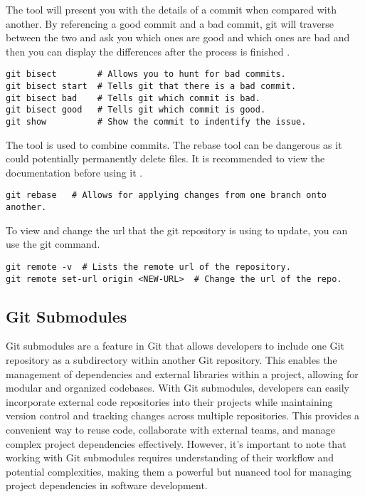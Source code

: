 The  tool will present you with the details of a commit when compared with another. By referencing a good commit and a bad commit, git will traverse between the two and ask you which ones are good and which ones are bad and then you can display the differences after the process is finished \cite{git}\cite{git: Advanced}.
\begin{lstlisting}[style=terminalstyle]
git bisect        # Allows you to hunt for bad commits.
git bisect start  # Tells git that there is a bad commit.
git bisect bad    # Tells git which commit is bad.
git bisect good   # Tells git which commit is good.
git show          # Show the commit to indentify the issue.
\end{lstlisting}

The  tool is used to combine commits. The rebase tool can be dangerous as it could potentially permanently delete files. It is recommended to view the documentation before using it \cite{git}\cite{git: Advanced}.
\begin{lstlisting}[style=terminalstyle]
git rebase   # Allows for applying changes from one branch onto another.
\end{lstlisting}

To view and change the url that the git repository is using to update, you can use the git  command.
\begin{lstlisting}[style=terminalstyle]
git remote -v  # Lists the remote url of the repository.
git remote set-url origin <NEW-URL>  # Change the url of the repo.
\end{lstlisting}












\subsection{Git Submodules}

Git submodules are a feature in Git that allows developers to include one Git repository as a subdirectory within another Git repository. This enables the management of dependencies and external libraries within a project, allowing for modular and organized codebases. With Git submodules, developers can easily incorporate external code repositories into their projects while maintaining version control and tracking changes across multiple repositories. This provides a convenient way to reuse code, collaborate with external teams, and manage complex project dependencies effectively. However, it's important to note that working with Git submodules requires understanding of their workflow and potential complexities, making them a powerful but nuanced tool for managing project dependencies in software development.

